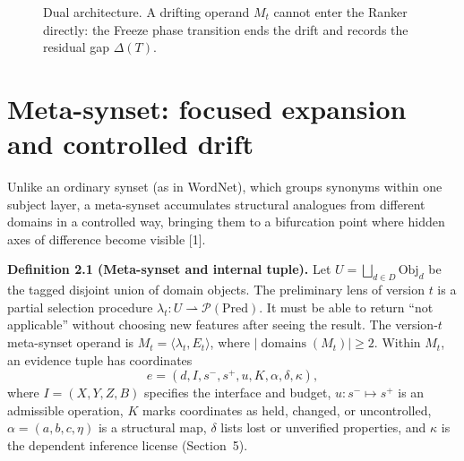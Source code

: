 \documentclass[11pt,a4paper]{article}
\begin{document}
\begin{figure}[htbp]
\centering
{}
\caption{Dual architecture. A drifting operand \(M_t\) cannot enter the Ranker directly: the Freeze phase transition ends the drift and records the residual gap \(\Delta(T)\).}
\end{figure}

\section{Meta-synset: focused expansion and controlled drift}

Unlike an ordinary synset (as in WordNet), which groups synonyms within one subject layer, a meta-synset accumulates structural analogues from different domains in a controlled way, bringing them to a bifurcation point where hidden axes of difference become visible [1].

\textbf{Definition 2.1 (Meta-synset and internal tuple).} Let \(U=\bigsqcup_{d\in D}\mathrm{Obj}_d\) be the tagged disjoint union of domain objects. The preliminary lens of version \(t\) is a partial selection procedure \(\lambda_t:U\rightharpoonup\mathcal P(\mathrm{Pred})\). It must be able to return “not applicable” without choosing new features after seeing the result. The version-\(t\) meta-synset operand is \(M_t=\langle\lambda_t,E_t\rangle\), where \(|\operatorname{domains}(M_t)|\ge2\). Within \(M_t\), an evidence tuple has coordinates
\[
e=(d,I,s^-,s^+,u,K,\alpha,\delta,\kappa),\tag{2}
\]
where \(I=(X,Y,Z,B)\) specifies the interface and budget, \(u:s^-\mapsto s^+\) is an admissible operation, \(K\) marks coordinates as held, changed, or uncontrolled, \(\alpha=(a,b,c,\eta)\) is a structural map, \(\delta\) lists lost or unverified properties, and \(\kappa\) is the dependent inference license (Section~5).
\end{document}
